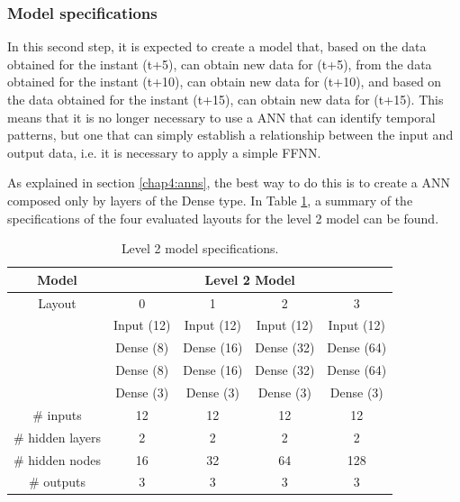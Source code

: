 \subsubsection{Model specifications}


In this second step, it is expected to create a model that, based on the data obtained for the instant (t+5), can obtain new data for (t+5), from the data obtained for the instant (t+10), can obtain new data for (t+10), and based on the data obtained for the instant (t+15), can obtain new data for (t+15). This means that it is no longer necessary to use a \ac{ANN} that can identify temporal patterns, but one that can simply establish a relationship between the input and output data, i.e. it is necessary to apply a simple \ac{FFNN}. 

As explained in section \ref{chap4:anns}, the best way to do this is to create a \ac{ANN} composed only by layers of the Dense type. In Table \ref{tab:level2arch}, a summary of the specifications of the four evaluated layouts for the level 2 model can be found.

\begin{table}[htbp]
  \centering
  \caption{Level 2 model specifications.}
    \begin{tabular}{c|cccc}
    \toprule
    \textbf{Model} & \multicolumn{4}{c}{Level 2 Model} \\
    \midrule
    Layout & 0     & 1      & 2     & 3 \\
    \midrule
          & Input (12) & Input (12) & Input (12) & Input (12) \\
          & Dense (8) & Dense (16) & Dense (32) & Dense (64) \\
          & Dense (8) & Dense (16) & Dense (32) & Dense (64) \\
          & Dense (3) & Dense (3) & Dense (3) & Dense (3) \\
    \midrule
    \# inputs & 12    & 12    & 12    & 12 \\
    \# hidden layers & 2     & 2     & 2     & 2 \\
    \# hidden nodes & 16    & 32    & 64    & 128 \\
    \# outputs & 3     & 3     & 3     & 3 \\
    \end{tabular}%
  \label{tab:level2arch}%
\end{table}%



